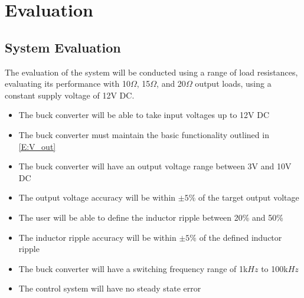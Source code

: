 \chapter{Evaluation}\label{C:evaluation}


\section{System Evaluation}
  
    The evaluation of the system will be conducted using a range of load resistances, evaluating its performance with 10$\Omega$, 15$\Omega$, and 20$\Omega$ output loads, using a constant supply voltage of 12V DC.

\begin{itemize}
	\item The buck converter will be able to take input voltages up to 12V DC
	
	\item The buck converter must maintain the basic functionality outlined in \cref{E:V_out}

	\item The buck converter will have an output voltage range between 3V and 10V DC
	
	\item The output voltage accuracy will be within $\pm 5\%$ of the target output voltage

	\item The user will be able to define the inductor ripple between 20\% and 50\%
	
	\item The inductor ripple accuracy will be within $\pm 5\%$ of the defined inductor ripple
	
	\item The buck converter will have a switching frequency range of 1k$Hz$ to 100k$Hz$

	\item The control system will have no steady state error

\end{itemize}